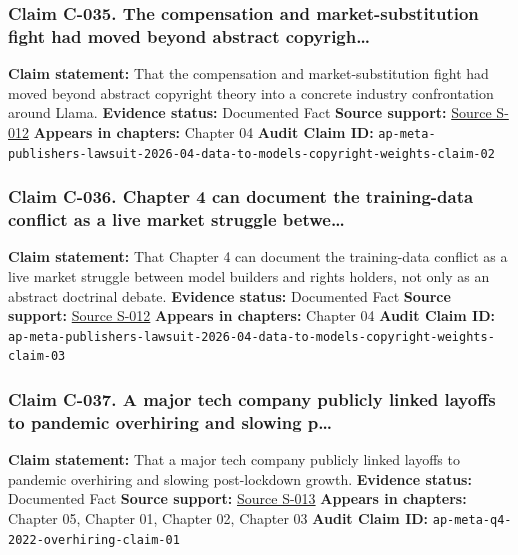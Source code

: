 \documentclass[
  american,
  11pt,
  letterpaper,
]{article}
\begin{document}
\subsubsection{Claim C-035. The compensation and market-substitution
fight had moved beyond abstract
copyrigh\ldots{}}\label{claim-c-035-the-compensation-and-market-substitution-fight-had-moved-beyond-abstract-copyrigh}

\textbf{Claim statement:} That the compensation and market-substitution
fight had moved beyond abstract copyright theory into a concrete
industry confrontation around Llama. \textbf{Evidence status:}
Documented Fact \textbf{Source support:}
\hyperref[source-s-012-mark-zuckerberg-personally-authorized-meta-s-copyright-infringement-publishers-allege]{Source
S-012} \textbf{Appears in chapters:} Chapter 04 \textbf{Audit Claim ID:}
\texttt{ap-meta-publishers-lawsuit-2026-04-data-to-models-copyright-weights-claim-02}

\subsubsection{Claim C-036. Chapter 4 can document the training-data
conflict as a live market struggle
betwe\ldots{}}\label{claim-c-036-chapter-4-can-document-the-training-data-conflict-as-a-live-market-struggle-betwe}

\textbf{Claim statement:} That Chapter 4 can document the training-data
conflict as a live market struggle between model builders and rights
holders, not only as an abstract doctrinal debate. \textbf{Evidence
status:} Documented Fact \textbf{Source support:}
\hyperref[source-s-012-mark-zuckerberg-personally-authorized-meta-s-copyright-infringement-publishers-allege]{Source
S-012} \textbf{Appears in chapters:} Chapter 04 \textbf{Audit Claim ID:}
\texttt{ap-meta-publishers-lawsuit-2026-04-data-to-models-copyright-weights-claim-03}

\subsubsection{Claim C-037. A major tech company publicly linked layoffs
to pandemic overhiring and slowing
p\ldots{}}\label{claim-c-037-a-major-tech-company-publicly-linked-layoffs-to-pandemic-overhiring-and-slowing-p}

\textbf{Claim statement:} That a major tech company publicly linked
layoffs to pandemic overhiring and slowing post-lockdown growth.
\textbf{Evidence status:} Documented Fact \textbf{Source support:}
\hyperref[source-s-013-meta-posts-lower-q4-profit-announces-huge-stock-buyback]{Source
S-013} \textbf{Appears in chapters:} Chapter 05, Chapter 01, Chapter 02,
Chapter 03 \textbf{Audit Claim ID:}
\texttt{ap-meta-q4-2022-overhiring-claim-01}
\end{document}
